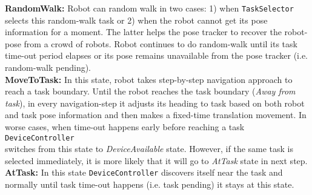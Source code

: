 \textbf{RandomWalk: }
Robot can random walk in two cases: 1) when \texttt{TaskSelector} selects this random-walk task or 2) when the robot cannot get its pose information for a moment. The latter helps the pose tracker to recover the robot-pose from a crowd of robots. Robot continues to do random-walk until its task time-out period elapses or its pose remains unavailable from the pose tracker (i.e. random-walk pending).\\
\textbf{MoveToTask: }
In this state, robot takes step-by-step navigation approach to reach a task boundary. Until the robot reaches the task boundary ({\em Away from task}), in every navigation-step it adjusts its heading to task based on both  robot and task pose information and then makes a fixed-time translation movement. In worse cases, when time-out happens early before reaching a task  \texttt{DeviceController}\\ switches from this state to\textit{ DeviceAvailable} state. However, if the same task is selected immediately, it is more likely that it will go to \textit{AtTask} state in next step.
\textbf{AtTask: }
In this state  \texttt{DeviceController} discovers itself near the task and normally until task time-out happens (i.e. task pending) it stays at this state.
